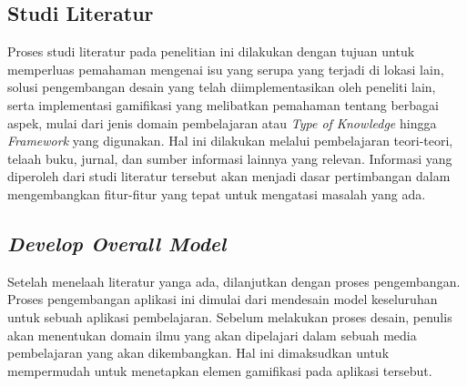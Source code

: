 \subsection{Studi Literatur}
Proses studi literatur pada penelitian ini dilakukan dengan tujuan untuk memperluas pemahaman mengenai isu yang serupa yang terjadi di lokasi lain, 
solusi pengembangan desain yang telah diimplementasikan oleh peneliti lain, serta implementasi gamifikasi yang melibatkan pemahaman tentang berbagai aspek, 
mulai dari jenis domain pembelajaran atau \textit{Type of Knowledge} hingga \textit{Framework} yang digunakan. 
Hal ini dilakukan melalui pembelajaran teori-teori, telaah buku, jurnal, dan sumber informasi lainnya yang relevan. 
Informasi yang diperoleh dari studi literatur tersebut akan menjadi dasar pertimbangan dalam mengembangkan fitur-fitur yang tepat untuk mengatasi masalah yang ada.
\subsection{\textit{Develop Overall Model}}
Setelah menelaah literatur yanga ada, dilanjutkan dengan proses pengembangan. Proses pengembangan aplikasi ini dimulai dari mendesain model keseluruhan untuk sebuah aplikasi pembelajaran.
Sebelum melakukan proses desain, penulis akan menentukan domain ilmu yang akan dipelajari dalam sebuah media pembelajaran yang akan dikembangkan. Hal ini dimaksudkan untuk mempermudah untuk menetapkan elemen gamifikasi pada aplikasi tersebut.
